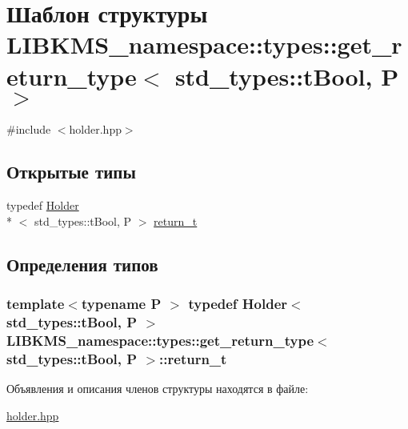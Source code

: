 \hypertarget{structLIBKMS__namespace_1_1types_1_1get__return__type_3_01std__types_1_1tBool_00_01P_01_4}{\section{Шаблон структуры L\-I\-B\-K\-M\-S\-\_\-namespace\-:\-:types\-:\-:get\-\_\-return\-\_\-type$<$ std\-\_\-types\-:\-:t\-Bool, P $>$}
\label{structLIBKMS__namespace_1_1types_1_1get__return__type_3_01std__types_1_1tBool_00_01P_01_4}
}


{\ttfamily \#include $<$holder.\-hpp$>$}

\subsection*{Открытые типы}
\begin{DoxyCompactItemize}
\item 
typedef \hyperlink{classLIBKMS__namespace_1_1Holder}{Holder}\\*
$<$ std\-\_\-types\-::t\-Bool, P $>$ \hyperlink{structLIBKMS__namespace_1_1types_1_1get__return__type_3_01std__types_1_1tBool_00_01P_01_4_aadbf1cfd527fd2c9bef1b3448656670b}{return\-\_\-t}
\end{DoxyCompactItemize}


\subsection{Определения типов}
\hypertarget{structLIBKMS__namespace_1_1types_1_1get__return__type_3_01std__types_1_1tBool_00_01P_01_4_aadbf1cfd527fd2c9bef1b3448656670b}{
\subsubsection[{return\-\_\-t}]{\setlength{\rightskip}{0pt plus 5cm}template$<$typename P $>$ typedef {\bf Holder}$<$ std\-\_\-types\-::t\-Bool, P $>$ {\bf L\-I\-B\-K\-M\-S\-\_\-namespace\-::types\-::get\-\_\-return\-\_\-type}$<$ std\-\_\-types\-::t\-Bool, P $>$\-::{\bf return\-\_\-t}}}\label{structLIBKMS__namespace_1_1types_1_1get__return__type_3_01std__types_1_1tBool_00_01P_01_4_aadbf1cfd527fd2c9bef1b3448656670b}


Объявления и описания членов структуры находятся в файле\-:\begin{DoxyCompactItemize}
\item 
\hyperlink{holder_8hpp}{holder.\-hpp}\end{DoxyCompactItemize}
